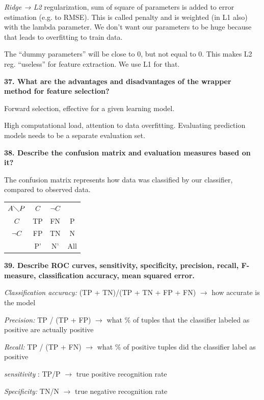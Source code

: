 \textit{Ridge → L2} regularization, sum of square of parameters is
added to error estimation (e.g. to RMSE). This is called penalty and is
weighted (in L1 also) with the lambda parameter. We don't want our
parameters to be huge because that leads to overfitting to train data.

The ``dummy parameters'' will be close to 0, but not equal to 0. This
makes L2 reg. ``useless'' for feature extraction. We use L1 for that.

\textbf{37. What are the advantages and disadvantages of the wrapper
method for feature selection?}

Forward selection, effective for a given learning model.

High computational load, attention to data overfitting. Evaluating
prediction models needs to be a separate evaluation set.

\textbf{38. Describe the confusion matrix and evaluation measures based
on it?}

The confusion matrix represents how data was classified by our
classifier, compared to observed data.

\begin{center}
  \begin{tabular}{|c||c|c|c|}
    \hline
    $A \diagdown P$ & $C$ & $\neg C$ & \\ \hhline{|=||=|=|=|}
    $C$ & TP & FN & P \\ \hline
    $\neg C$ & FP & TN & N \\ \hline
     & P' & N' & All \\ \hline
  \end{tabular}
\end{center}


\textbf{39. Describe ROC curves, sensitivity, specificity, precision,
recall, F-measure, classification accuracy, mean squared error.}

\textit{Classification accuracy:} (TP + TN)/(TP + TN + FP + FN)
$\rightarrow$ how accurate is the model

\textit{Precision:} TP / (TP + FP) $\rightarrow$ what \% of tuples
that the classifier labeled as positive are actually positive

\textit{Recall:} TP / (TP + FN) $\rightarrow$ what \% of positive
tuples did the classifier label as positive

\textit{sensitivity} : TP/P $\rightarrow$ true positive recognition
rate

\textit{Specificity:} TN/N $\rightarrow$ true negative recognition
rate

